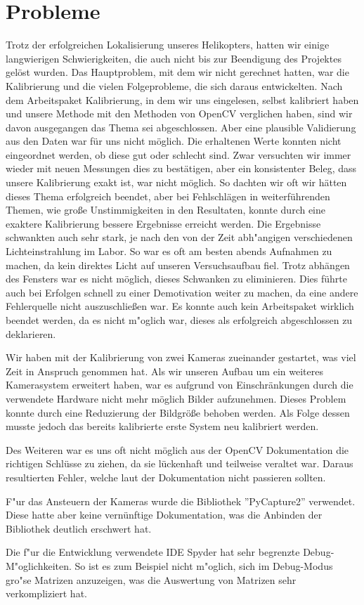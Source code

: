\chapter{Probleme}
\label{cha:probleme}

Trotz der erfolgreichen Lokalisierung unseres Helikopters, hatten wir einige langwierigen Schwierigkeiten, die auch nicht bis zur Beendigung des Projektes gelöst wurden. Das Hauptproblem, mit dem wir nicht gerechnet hatten, war die Kalibrierung und die vielen Folgeprobleme, die sich daraus entwickelten. Nach dem Arbeitspaket Kalibrierung, in dem wir uns eingelesen, selbst kalibriert haben und unsere Methode mit den Methoden von OpenCV verglichen haben, sind wir davon ausgegangen das Thema sei abgeschlossen. Aber eine plausible Validierung aus den Daten war für uns nicht möglich. Die erhaltenen Werte konnten nicht eingeordnet werden, ob diese gut oder schlecht sind. Zwar versuchten wir immer wieder mit neuen Messungen dies zu bestätigen, aber ein konsistenter Beleg, dass unsere Kalibrierung exakt ist, war nicht möglich. So dachten wir oft wir hätten dieses Thema erfolgreich beendet, aber bei Fehlschlägen in weiterführenden Themen, wie große Unstimmigkeiten in den Resultaten, konnte durch eine exaktere Kalibrierung bessere Ergebnisse erreicht werden. Die Ergebnisse schwankten auch sehr stark, je nach den von der Zeit abh"angigen verschiedenen Lichteinstrahlung im Labor. So war es oft am besten abends Aufnahmen zu machen, da kein direktes Licht auf unseren Versuchsaufbau fiel. Trotz  abhängen des Fensters war es nicht möglich, dieses Schwanken zu eliminieren. Dies führte auch bei Erfolgen schnell zu einer Demotivation weiter zu machen, da eine andere Fehlerquelle nicht auszuschließen war. Es konnte auch kein Arbeitspaket wirklich beendet werden, da es nicht m"oglich war, dieses als erfolgreich abgeschlossen zu deklarieren.

\noindent Wir haben mit der Kalibrierung von zwei Kameras zueinander gestartet, was viel Zeit in Anspruch genommen hat. Als wir unseren Aufbau um ein weiteres Kamerasystem erweitert haben, war es aufgrund von Einschränkungen durch die verwendete Hardware nicht mehr möglich Bilder aufzunehmen. Dieses Problem konnte durch eine Reduzierung der Bildgröße behoben werden. Als Folge dessen musste jedoch das bereits kalibrierte erste System neu kalibriert werden.

\noindent Des Weiteren war es uns oft nicht möglich aus der OpenCV Dokumentation die richtigen Schlüsse zu ziehen, da sie lückenhaft und teilweise veraltet war. Daraus resultierten Fehler, welche laut der Dokumentation nicht passieren sollten.\newline

\noindent F"ur das Ansteuern der Kameras wurde die Bibliothek ''PyCapture2'' verwendet. Diese hatte aber keine vernünftige Dokumentation, was die Anbinden der Bibliothek deutlich erschwert hat.\newline

\noindent Die f"ur die Entwicklung verwendete IDE Spyder hat sehr begrenzte Debug-M"oglichkeiten. So ist es zum Beispiel nicht m"oglich, sich im Debug-Modus gro"se Matrizen anzuzeigen, was die Auswertung von Matrizen sehr verkompliziert hat.
